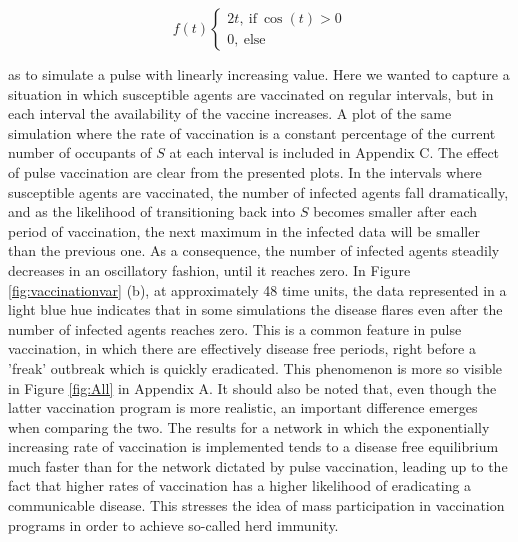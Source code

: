 $$
f(t)
\begin{cases}
2t, \ \text{if}\ \cos(t) > 0\\
0, \ \text{else}
\end{cases}
$$

as to simulate a pulse with linearly increasing value. Here we wanted to capture a situation in which susceptible agents are vaccinated on regular intervals, but in each interval the availability of the vaccine increases. A plot of the same simulation where the rate of vaccination is a constant percentage of the current number of occupants of $S$ at each interval is included in Appendix C. The effect of pulse vaccination are clear from the presented plots. In the intervals where susceptible agents are vaccinated, the number of infected agents fall dramatically, and as the likelihood of transitioning back into $S$ becomes smaller after each period of vaccination, the next maximum in the infected data will be smaller than the previous one. As a consequence, the number of infected agents steadily decreases in an oscillatory fashion, until it reaches zero. In Figure \ref{fig:vaccinationvar} (b), at approximately 48 time units, the data represented in a light blue hue indicates that in some simulations the disease flares even after the number of infected agents reaches zero. This is a common feature in pulse vaccination, in which there are effectively disease free periods, right before a 'freak' outbreak which is quickly eradicated. This phenomenon is more so visible in Figure \ref{fig:All} in Appendix A. It should also be noted that, even though the latter vaccination program is more realistic, an important difference emerges when comparing the two. The results for a network in which the exponentially increasing rate of vaccination is implemented tends to a disease free equilibrium much faster than for the network dictated by pulse vaccination, leading up to the fact that higher rates of vaccination has a higher likelihood of eradicating a communicable disease. This stresses the idea of mass participation in vaccination programs in order to achieve so-called herd immunity.  
\\

